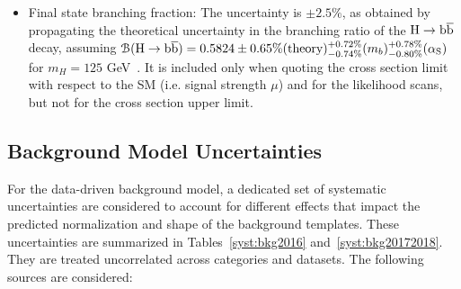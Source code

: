 \begin{itemize}
    \item {Final state branching fraction:} The uncertainty is $\pm 2.5\%$, as obtained by propagating the theoretical uncertainty in the branching ratio of the $\mathrm{H \rightarrow b \overline {b}}$ decay, assuming $\mathcal{B}(\mathrm{H \rightarrow b \overline {b}}) = 0.5824 \pm 0.65\% (\text{theory}) {}^{+0.72\%}_{-0.74\%} (m_{b}) {}^{+0.78\%}_{-0.80\%} (\alpha_\text{S})$ for $m_{H} = 125$ GeV~\cite{HiggsBRTwiki}. It is included only when quoting the cross section limit with respect to the SM (i.e. signal strength $\mu$) and for the likelihood scans, but not for the cross section upper limit.    
\end{itemize}
\subsection{Background Model Uncertainties} \label{bkgsystematics}
For the data-driven background model, a dedicated set of systematic uncertainties are considered to account for different effects that impact the predicted normalization and shape of the background templates. These uncertainties are summarized in Tables~\ref{syst:bkg2016} and~\ref{syst:bkg20172018}. They are treated uncorrelated across categories and datasets. The following sources are considered:
